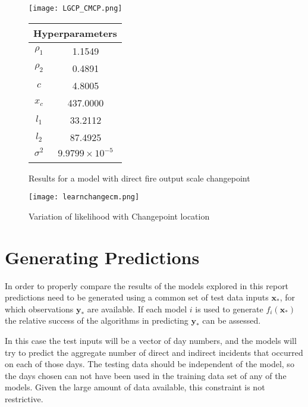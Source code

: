 \documentclass[a4paper,11pt]{report}
\begin{document}
  \begin{figure}[!ht]
    \centering
    \texttt{[image: LGCP\_CMCP.png]}
    \qquad
    \doublespacing
    \begin{tabular}[b]{cc}
    \multicolumn{2}{c}{\textbf{Hyperparameters}}                                            \\ \hline
      \(\rho_1\)                    & 1.1549                \\                       
\(\rho_2\)                     & 0.4891                           \\            
\(c\)                               & 4.8005                                      \\ 
\(x_c\)                        & 437.0000                                         \\ 
\(l_1\)                               & 33.2112                                      \\  
\(l_2\) & 87.4925 \\ 
\(\sigma^2\) & \(9.9799 \times 10^{-5}\) \\ 
& \\
    \end{tabular}
    \captionsetup{labelformat=andtable}
    \caption{Results for a model with direct fire output scale changepoint}
  \end{figure}
  
\begin{figure}
\centering
\texttt{[image: learnchangecm.png]}
\caption{Variation of likelihood with Changepoint location}
\label{fig:cmcpvariation}
\end{figure}

\chapter{Generating Predictions}

In order to properly compare the results of the models explored in this report predictions need to be generated using a common set of test data inputs \(\mathbf{x_*}\), for which observations \(\mathbf{y}_*\) are available. If each model \(i\) is used to generate \(f_i(\mathbf{x_*})\) the relative success of the algorithms in predicting \(\mathbf{y}_*\) can be assessed. \par

In this case the test inputs will be a vector of day numbers, and the models will try to predict the aggregate number of direct and indirect incidents that occurred on each of those days. The testing data should be independent of the model, so the days chosen can not have been used in the training data set of any of the models. Given the large amount of data available, this constraint is not restrictive. \par
\end{document}
